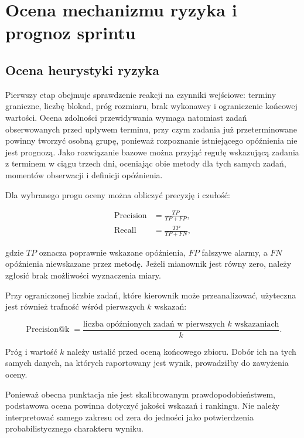 \section{Ocena mechanizmu ryzyka i prognoz sprintu}

\subsection{Ocena heurystyki ryzyka}

Pierwszy etap obejmuje sprawdzenie reakcji na czynniki wejściowe: terminy graniczne, liczbę blokad, próg rozmiaru, brak wykonawcy i ograniczenie końcowej wartości. Ocena zdolności przewidywania wymaga natomiast zadań obserwowanych przed upływem terminu, przy czym zadania już przeterminowane powinny tworzyć osobną grupę, ponieważ rozpoznanie istniejącego opóźnienia nie jest prognozą. Jako rozwiązanie bazowe można przyjąć regułę wskazującą zadania z terminem w ciągu trzech dni, oceniając obie metody dla tych samych zadań, momentów obserwacji i definicji opóźnienia.

Dla wybranego progu oceny można obliczyć precyzję i czułość:

\begin{align}
    \operatorname{Precision}
    &= \frac{TP}{TP+FP},\\
    \operatorname{Recall}
    &= \frac{TP}{TP+FN},
    \label{eq:testy-precision-recall}
\end{align}

gdzie \(TP\) oznacza poprawnie wskazane opóźnienia, \(FP\) fałszywe alarmy, a \(FN\) opóźnienia niewskazane przez metodę. Jeżeli mianownik jest równy zero, należy zgłosić brak możliwości wyznaczenia miary.

Przy ograniczonej liczbie zadań, które kierownik może przeanalizować, użyteczna jest również trafność wśród pierwszych \(k\) wskazań:

\begin{equation}
    \operatorname{Precision@k}
    =
    \frac{\text{liczba opóźnionych zadań w pierwszych }k\text{ wskazaniach}}{k}.
    \label{eq:testy-precision-k}
\end{equation}

Próg i wartość \(k\) należy ustalić przed oceną końcowego zbioru. Dobór ich na tych samych danych, na których raportowany jest wynik, prowadziłby do zawyżenia oceny.

Ponieważ obecna punktacja nie jest skalibrowanym prawdopodobieństwem, podstawowa ocena powinna dotyczyć jakości wskazań i rankingu. Nie należy interpretować samego zakresu od zera do jedności jako potwierdzenia probabilistycznego charakteru wyniku.

